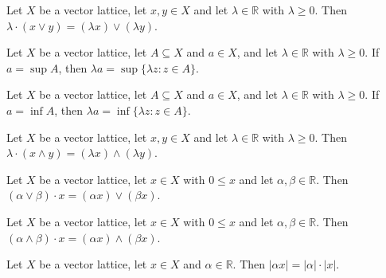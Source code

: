 \begin{lemma}
\label{lem:nonneg-smul-sup}
\leanok
Let $X$ be a vector lattice, let $x, y \in X$ and let $\lambda \in
\mathbb{R}$ with $\lambda \ge 0$. Then
$\lambda \cdot (x \vee y) = (\lambda x) \vee (\lambda y).$
\end{lemma}

\begin{lemma}
\label{lem:isLUB-smul-of-nonneg}
\leanok
Let $X$ be a vector lattice, let $A \subseteq X$ and $a \in X$, and let
$\lambda \in \mathbb{R}$ with $\lambda \ge 0$. If $a = \sup A$, then
$\lambda a = \sup \{\lambda z : z \in A\}$.
\end{lemma}

\begin{lemma}
\label{lem:isGLB-smul-of-nonneg}
\leanok
Let $X$ be a vector lattice, let $A \subseteq X$ and $a \in X$, and let
$\lambda \in \mathbb{R}$ with $\lambda \ge 0$. If $a = \inf A$, then
$\lambda a = \inf \{\lambda z : z \in A\}$.
\end{lemma}

\begin{lemma}
\label{lem:nonneg-smul-inf}
\leanok
{}
Let $X$ be a vector lattice, let $x, y \in X$ and let $\lambda \in
\mathbb{R}$ with $\lambda \ge 0$. Then
$\lambda \cdot (x \wedge y) = (\lambda x) \wedge (\lambda y).$
\end{lemma}

\begin{lemma}
\label{lem:sup-smul-nonneg}
\leanok
Let $X$ be a vector lattice, let $x \in X$ with $0 \le x$ and let
$\alpha, \beta \in \mathbb{R}$. Then
$(\alpha \vee \beta) \cdot x = (\alpha x) \vee (\beta x).$
\end{lemma}

\begin{lemma}
\label{lem:inf-smul-nonneg}
\leanok
Let $X$ be a vector lattice, let $x \in X$ with $0 \le x$ and let
$\alpha, \beta \in \mathbb{R}$. Then
$(\alpha \wedge \beta) \cdot x = (\alpha x) \wedge (\beta x).$
\end{lemma}

\begin{theorem}
\label{thm:abs-smul}
\leanok
{}
Let $X$ be a vector lattice, let $x \in X$ and $\alpha \in \mathbb{R}$.
Then $\lvert \alpha x \rvert = \lvert \alpha\rvert \cdot \lvert x\rvert.$
\end{theorem}

